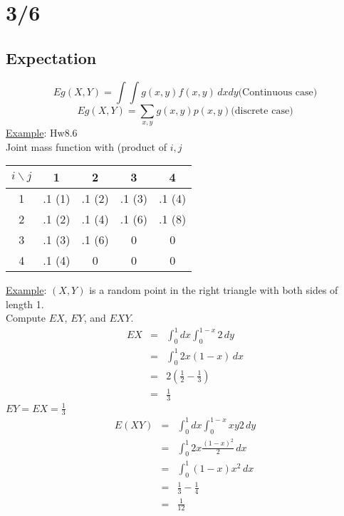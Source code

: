 \section*{3/6}
  \subsection*{Expectation}
    $$
      Eg(X,Y) = \int\int g(x,y)f(x,y)\,dxdy \text{(Continuous case)}
    $$
    $$
      Eg(X,Y) = \sum_{x,y}g(x,y)p(x,y) \text{(discrete case)}
    $$
    \underline{Example}: Hw8.6\\
      Joint mass function with (product of $i,j$
      \begin{tabular}{c | c | c| c | c}
        $i \backslash j$  & 1 & 2 & 3 & 4\\
        \hline
        1 &  .1 (1) & .1 (2) & .1 (3) & .1 (4)\\
        \hline
        2 &  .1 (2) & .1 (4) & .1 (6) & .1 (8)\\
        \hline
        3 &  .1 (3) & .1 (6) & 0 & 0\\
        \hline
        4 &  .1 (4) & 0 & 0 & 0\\
      \end{tabular}

    \noindent\underline{Example}: $(X,Y)$ is a random point in the right 
    triangle with both sides of length 1.\\
    Compute $EX$, $EY$, and $EXY$.\\
    \begin{eqnarray*}
      EX & = & \int_0^1 dx \int_0 ^{1-x} 2\,dy\\
      & = & \int_0^1 2x(1-x)\,dx\\
      & = & 2(\frac{1}{2} - \frac{1}{3})\\
      & = & \frac{1}{3}
    \end{eqnarray*}
    $EY = EX = \frac{1}{3}$
    \begin{eqnarray*}
      E(XY) & = & \int_0^{1} dx \int_0^{1-x} xy 2\,dy\\
        & = & \int_0^1 2x\frac{(1-x)^2}{2} \,dx\\
        & = & \int_0^1 (1-x)x^2 \,dx\\
        & = & \frac{1}{3} - \frac{1}{4}\\
        & = & \frac{1}{12}
    \end{eqnarray*}

